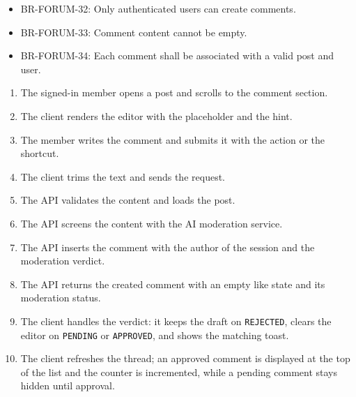 \begin{itemize}[leftmargin=1.6em,topsep=3pt,itemsep=2pt,parsep=0pt,label=$\bullet$]\brrulelist
      \item BR-FORUM-32: Only authenticated users can create comments.
      \item BR-FORUM-33: Comment content cannot be empty.
      \item BR-FORUM-34: Each comment shall be associated with a valid post and user.
\end{itemize}

\begin{enumerate}[leftmargin=1.8em,topsep=3pt,itemsep=2pt,parsep=0pt]
      \item The signed-in member opens a post and scrolls to the comment section.
      \item The client renders the editor with the placeholder and the hint.
      \item The member writes the comment and submits it with the action or the shortcut.
      \item The client trims the text and sends the request.
      \item The API validates the content and loads the post.
      \item The API screens the content with the AI moderation service.
      \item The API inserts the comment with the author of the session and the moderation
            verdict.
      \item The API returns the created comment with an empty like state and its moderation
            status.
      \item The client handles the verdict: it keeps the draft on \texttt{REJECTED}, clears
            the editor on \texttt{PENDING} or \texttt{APPROVED}, and shows the matching
            toast.
      \item The client refreshes the thread; an approved comment is displayed at the top of
            the list and the counter is incremented, while a pending comment stays hidden
            until approval.
\end{enumerate}

